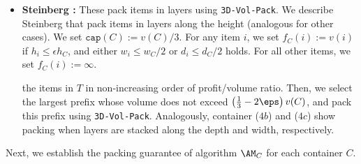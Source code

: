 \begin{itemize}
    $\AM_C$ sorts the items of $T$ in non-decreasing order of profit/volume and selects the largest prefix with volume not exceeding $(1-3\eps)w_Ch_Cd_C$. We pack this prefix using \tNFDH.
    
    \item \textbf{Steinberg \boxes:} These \boxes pack items in layers using \texttt{3D-Vol-Pack}. We describe Steinberg \boxes that pack items in layers along the height  (analogous for other cases). We set $\mathtt{cap}(C) := v(C)/3$. For any item $i$, we set $f_C(i):= v(i)$ if $h_i \le \epsilon h_C$, and either $w_i \le w_C/2$ or $d_i \le d_C/2$ holds. For all other items, we set $f_C(i) := \infty$.

     the items in $T$ in non-increasing order of profit/volume ratio.
    Then, we select the largest prefix whose volume does not exceed $\left(\frac13-2\eps\right)v(C)$, and pack this prefix using \texttt{3D-Vol-Pack}.
    Analogously, container ($4b$) and ($4c$) show packing when layers are stacked along the depth and width, respectively.
\end{itemize}

Next, we establish the packing guarantee of algorithm $\AM_C$ for each container $C$.

